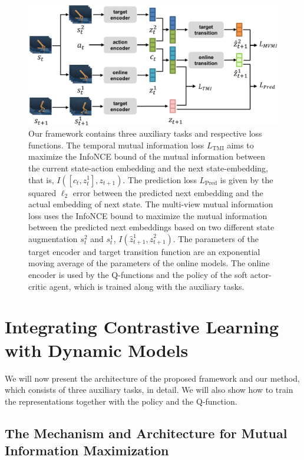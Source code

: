 \documentclass[a4paper,12pt]{article}
\begin{document}
\begin{figure}
\centering
\includegraphics[width=\textwidth]{framework.pdf}
\caption{Our framework contains three auxiliary tasks and respective loss functions. The temporal mutual information loss $L_\text{TMI}$ aims to maximize the InfoNCE bound of the mutual information between the current state-action embedding and the next state-embedding, that is, $I([c_t, z_{t}^1], z_{t+1})$. The prediction loss $L_\text{Pred}$ is given by the squared $\ell_2$ error between the predicted next embedding and the actual embedding of next state. The multi-view mutual information loss uses the InfoNCE bound to maximize the mutual information between the predicted next embeddings based on two different state augmentation $s_t^2$ and $s_t^1$, $I(\hat{z}_{t+1}^1,\hat{z}_{t+1}^2)$. 
The parameters of the target encoder and target transition function are an exponential moving average of the parameters of the online models. The online encoder is used by the Q-functions and the policy of the soft actor-critic agent, which is trained along with the auxiliary tasks.} 
\label{fig:Schematic}
\end{figure}

\section{Integrating Contrastive Learning with Dynamic Models}
\label{section:method}

We will now present the architecture of the proposed framework and our method, which consists of three auxiliary tasks, in detail. We will also show how to train the representations together with the policy and the Q-function.

\subsection{The Mechanism and Architecture for Mutual Information Maximization}
\end{document}
